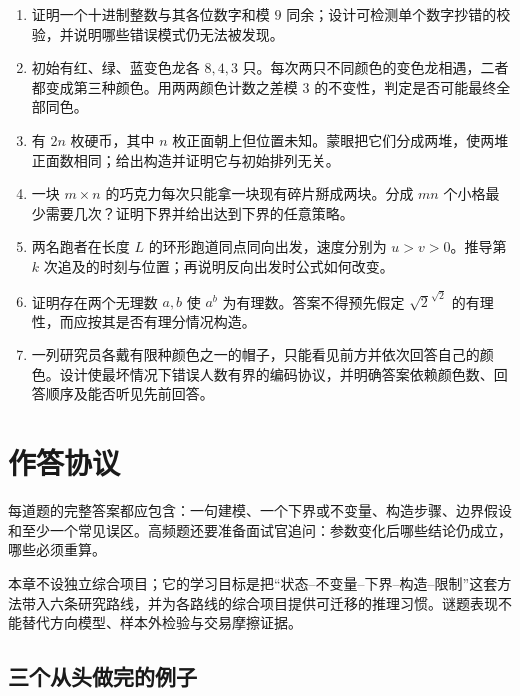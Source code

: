 \begin{enumerate}[leftmargin=*]
  \item {}证明一个十进制整数与其各位数字和模 $9$ 同余；设计可检测单个数字抄错的校验，并说明哪些错误模式仍无法被发现。
  \item {}初始有红、绿、蓝变色龙各 $8,4,3$ 只。每次两只不同颜色的变色龙相遇，二者都变成第三种颜色。用两两颜色计数之差模 $3$ 的不变性，判定是否可能最终全部同色。
  \item {}有 $2n$ 枚硬币，其中 $n$ 枚正面朝上但位置未知。蒙眼把它们分成两堆，使两堆正面数相同；给出构造并证明它与初始排列无关。
  \item {}一块 $m\times n$ 的巧克力每次只能拿一块现有碎片掰成两块。分成 $mn$ 个小格最少需要几次？证明下界并给出达到下界的任意策略。
  \item {}两名跑者在长度 $L$ 的环形跑道同点同向出发，速度分别为 $u>v>0$。推导第 $k$ 次追及的时刻与位置；再说明反向出发时公式如何改变。
  \item {}证明存在两个无理数 $a,b$ 使 $a^b$ 为有理数。答案不得预先假定 $\sqrt2^{\sqrt2}$ 的有理性，而应按其是否有理分情况构造。
  \item {}一列研究员各戴有限种颜色之一的帽子，只能看见前方并依次回答自己的颜色。设计使最坏情况下错误人数有界的编码协议，并明确答案依赖颜色数、回答顺序及能否听见先前回答。
\end{enumerate}

\section{作答协议}

每道题的完整答案都应包含：一句建模、一个下界或不变量、构造步骤、边界假设和至少一个常见误区。高频题还要准备面试官追问：参数变化后哪些结论仍成立，哪些必须重算。

本章不设独立综合项目；它的学习目标是把“状态--不变量--下界--构造--限制”这套方法带入六条研究路线，并为各路线的综合项目提供可迁移的推理习惯。谜题表现不能替代方向模型、样本外检验与交易摩擦证据。
\subsection{三个从头做完的例子}

